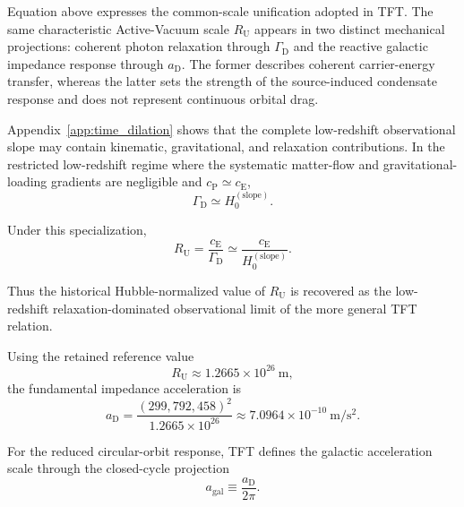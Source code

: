 Equation above expresses the common-scale unification adopted in TFT. The same
characteristic Active-Vacuum scale $R_{\mathrm U}$ appears in two distinct
mechanical projections: coherent photon relaxation through
$\Gamma_{\mathrm D}$ and the reactive galactic impedance response through
$a_{\mathrm D}$. The former describes coherent carrier-energy transfer,
whereas the latter sets the strength of the source-induced condensate response
and does not represent continuous orbital drag.

Appendix~\ref{app:time_dilation} shows that the complete low-redshift
observational slope may contain kinematic, gravitational, and relaxation
contributions. In the restricted low-redshift regime where the systematic
matter-flow and gravitational-loading gradients are negligible and
$c_{\mathrm P}\simeq c_{\mathrm E}$,
\begin{equation}
    \Gamma_{\mathrm D}
    \simeq
    H_{0}^{(\mathrm{slope})}.
\end{equation}

Under this specialization,
\begin{equation}
    R_{\mathrm U}
    =
    \frac{
        c_{\mathrm E}
    }{
        \Gamma_{\mathrm D}
    }
    \simeq
    \frac{
        c_{\mathrm E}
    }{
        H_{0}^{(\mathrm{slope})}
    }.
\end{equation}

Thus the historical Hubble-normalized value of $R_{\mathrm U}$ is recovered as
the low-redshift relaxation-dominated observational limit of the more general
TFT relation.

Using the retained reference value
\begin{equation}
    R_{\mathrm U}
    \approx
    1.2665\times10^{26}\ \mathrm m,
\end{equation}
the fundamental impedance acceleration is
\begin{equation}
    \boxed{
    a_{\mathrm D}
    =
    \frac{
        (299,792,458)^2
    }{
        1.2665\times10^{26}
    }
    \approx
    7.0964\times10^{-10}\ \mathrm{m/s^2}.
    }
\end{equation}

For the reduced circular-orbit response, TFT defines the galactic acceleration
scale through the closed-cycle projection
\begin{equation}
    \boxed{
    a_{\mathrm{gal}}
    \equiv
    \frac{
        a_{\mathrm D}
    }{
        2\pi
    }.
    }
\end{equation}

